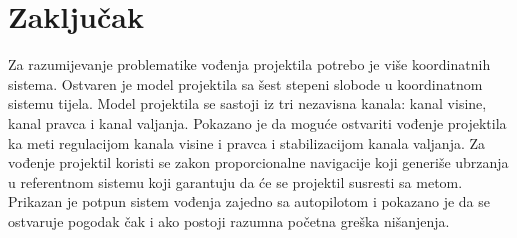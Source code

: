 \documentclass[12pt, twoside]{report}
\begin{document}
\chapter{Zaključak}
Za razumijevanje problematike vođenja projektila potrebo je više koordinatnih sistema. 
Ostvaren je model projektila sa šest stepeni slobode u koordinatnom sistemu tijela. 
Model projektila se sastoji iz tri nezavisna kanala: kanal visine, kanal pravca i kanal valjanja.
Pokazano je da moguće ostvariti vođenje projektila ka meti regulacijom kanala visine i pravca i 
stabilizacijom kanala valjanja. Za vođenje projektil koristi se zakon proporcionalne navigacije 
koji generiše ubrzanja u referentnom sistemu koji garantuju da će se projektil susresti sa metom.
Prikazan je potpun sistem vođenja zajedno sa autopilotom i pokazano je da 
se ostvaruje pogodak čak i ako postoji razumna početna greška nišanjenja. 


\nocite{*}
\printbibliography
\end{document}
